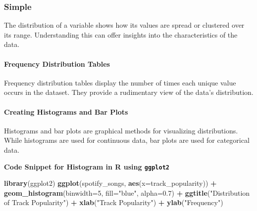 \documentclass[
  b5paper]{book}
\newenvironment{Shaded}{\begin{snugshade}}{\end{snugshade}}
\newcommand{\AttributeTok}[1]{\textcolor[rgb]{0.13,0.29,0.53}{#1}}
\newcommand{\DecValTok}[1]{\textcolor[rgb]{0.00,0.00,0.81}{#1}}
\newcommand{\FloatTok}[1]{\textcolor[rgb]{0.00,0.00,0.81}{#1}}
\newcommand{\FunctionTok}[1]{\textcolor[rgb]{0.13,0.29,0.53}{\textbf{#1}}}
\newcommand{\NormalTok}[1]{#1}
\newcommand{\SpecialCharTok}[1]{\textcolor[rgb]{0.81,0.36,0.00}{\textbf{#1}}}
\newcommand{\StringTok}[1]{\textcolor[rgb]{0.31,0.60,0.02}{#1}}
\begin{document}
\hypertarget{simple}{%
\subsubsection{Simple}\label{simple}}

The distribution of a variable shows how its values are spread or clustered over its range. Understanding this can offer insights into the characteristics of the data.

\hypertarget{frequency-distribution-tables}{%
\paragraph{Frequency Distribution Tables}\label{frequency-distribution-tables}}

Frequency distribution tables display the number of times each unique value occurs in the dataset. They provide a rudimentary view of the data's distribution.

\hypertarget{creating-histograms-and-bar-plots}{%
\paragraph{Creating Histograms and Bar Plots}\label{creating-histograms-and-bar-plots}}

Histograms and bar plots are graphical methods for visualizing distributions. While histograms are used for continuous data, bar plots are used for categorical data.

\textbf{Code Snippet for Histogram in R using \texttt{ggplot2}}

\begin{Shaded}
\begin{Highlighting}[]
\FunctionTok{library}\NormalTok{(ggplot2)}
\FunctionTok{ggplot}\NormalTok{(spotify\_songs, }\FunctionTok{aes}\NormalTok{(}\AttributeTok{x=}\NormalTok{track\_popularity)) }\SpecialCharTok{+}
  \FunctionTok{geom\_histogram}\NormalTok{(}\AttributeTok{binwidth=}\DecValTok{5}\NormalTok{, }\AttributeTok{fill=}\StringTok{"blue"}\NormalTok{, }\AttributeTok{alpha=}\FloatTok{0.7}\NormalTok{) }\SpecialCharTok{+}
  \FunctionTok{ggtitle}\NormalTok{(}\StringTok{"Distribution of Track Popularity"}\NormalTok{) }\SpecialCharTok{+}
  \FunctionTok{xlab}\NormalTok{(}\StringTok{"Track Popularity"}\NormalTok{) }\SpecialCharTok{+}
  \FunctionTok{ylab}\NormalTok{(}\StringTok{"Frequency"}\NormalTok{)}
\end{Highlighting}
\end{Shaded}
\end{document}
